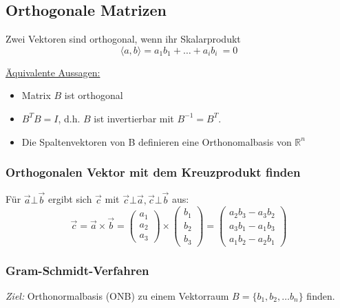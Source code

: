\subsection{Orthogonale Matrizen}

Zwei Vektoren sind orthogonal, wenn ihr Skalarprodukt\\ 
\begin{equation*}
    \langle a, b \rangle = a_1 b_1 + \hdots + a_i b_i\ = 0
\end{equation*}

\underline{Äquivalente Aussagen:}
\begin{itemize}
    \item Matrix \(B\) ist orthogonal
    \item \(B^T B = I\), d.h. \(B\) ist invertierbar mit \(B^{-1}=B^T\).
    \item Die Spaltenvektoren von B definieren eine Orthonomalbasis von \(\mathbb{R}^n\)\\
\end{itemize}

\subsubsection{Orthogonalen Vektor mit dem Kreuzprodukt finden}
Für \(\vec{a} \bot \vec{b}\) ergibt sich \(\vec{c}\) mit \(\vec{c} \bot \vec{a}, \vec{c} \bot \vec{b}\) aus:
\begin{equation*}
    \vec{c} = 
    \vec{a} \times \vec{b} = \begin{pmatrix}
        a_1 \\
        a_2 \\
        a_3
    \end{pmatrix} \times
    \begin{pmatrix}
        b_1 \\
        b_2 \\
        b_3
    \end{pmatrix} =
    \begin{pmatrix}
        a_2 b_3 - a_3 b_2 \\
        a_3 b_1 - a_1 b_3 \\
        a_1 b_2 - a_2 b_1
    \end{pmatrix}
\end{equation*}

\subsubsection{Gram-Schmidt-Verfahren}
\textit{Ziel:} Orthonormalbasis (ONB) zu einem Vektorraum \(B=\{b_1, b_2, \hdots b_n\}\) finden.

